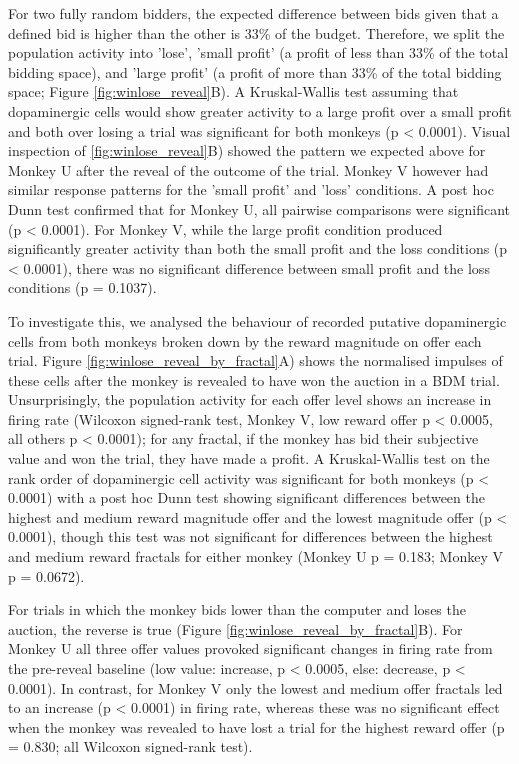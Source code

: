 For two fully random bidders, the expected difference between bids given that a defined bid is higher than the other is 33\% of the budget. Therefore, we split the population activity into 'lose', 'small profit' (a profit of less than 33\% of the total bidding space), and 'large profit' (a profit of more than 33\% of the total bidding space; Figure \ref{fig:winlose_reveal}B). A Kruskal-Wallis test assuming that dopaminergic cells would show greater activity to a large profit over a small profit and both over losing a trial was significant for both monkeys (p < 0.0001). Visual inspection of \ref{fig:winlose_reveal}B) showed the pattern we expected above for Monkey U after the reveal of the outcome of the trial. Monkey V however had similar response patterns for the 'small profit' and 'loss' conditions. A post hoc Dunn test confirmed that for Monkey U, all pairwise comparisons were significant (p < 0.0001). For Monkey V, while the large profit condition produced significantly greater activity than both the small profit and the loss conditions (p < 0.0001), there was no significant difference between small profit and the loss conditions (p = 0.1037).

To investigate this, we analysed the behaviour of recorded putative dopaminergic cells from both monkeys broken down by the reward magnitude on offer each trial. Figure \ref{fig:winlose_reveal_by_fractal}A) shows the normalised impulses of these cells after the monkey is revealed to have won the auction in a BDM trial. Unsurprisingly, the population activity for each offer level shows an increase in firing rate (Wilcoxon signed-rank test, Monkey V, low reward offer p < 0.0005, all others p < 0.0001); for any fractal, if the monkey has bid their subjective value and won the trial, they have made a profit. A Kruskal-Wallis test on the rank order of dopaminergic cell activity was significant for both monkeys (p < 0.0001) with a post hoc Dunn test showing significant differences between the highest and medium reward magnitude offer and the lowest magnitude offer (p < 0.0001), though this test was not significant for differences between the highest and medium reward fractals for either monkey (Monkey U p = 0.183; Monkey V p = 0.0672).

For trials in which the monkey bids lower than the computer and loses the auction, the reverse is true (Figure \ref{fig:winlose_reveal_by_fractal}B). For Monkey U all three offer values provoked significant changes in firing rate from the pre-reveal baseline (low value: increase, p < 0.0005, else: decrease, p < 0.0001). In contrast, for Monkey V only the lowest and medium offer fractals led to an increase (p < 0.0001) in firing rate, whereas these was no significant effect when the monkey was revealed to have lost a trial for the highest reward offer (p = 0.830; all Wilcoxon signed-rank test).

